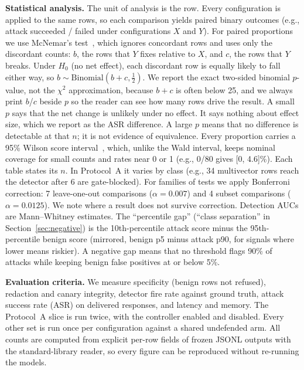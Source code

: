 \documentclass[conference]{IEEEtran}
\begin{document}
\textbf{Statistical analysis.} The unit of analysis is the row. Every configuration is applied to the same rows, so each comparison yields paired binary outcomes (e.g., attack succeeded / failed under configurations $X$ and $Y$). For paired proportions we use McNemar's test~\cite{mcnemar1947}, which ignores concordant rows and uses only the discordant counts: $b$, the rows that $Y$ fixes relative to $X$, and $c$, the rows that $Y$ breaks. Under $H_0$ (no net effect), each discordant row is equally likely to fall either way, so $b \sim \mathrm{Binomial}(b+c, \tfrac12)$. We report the exact two-sided binomial $p$-value, not the $\chi^2$ approximation, because $b+c$ is often below 25, and we always print $b$/$c$ beside $p$ so the reader can see how many rows drive the result. A small $p$ says that the net change is unlikely under no effect. It says nothing about effect size, which we report as the ASR difference. A large $p$ means that no difference is detectable at that $n$; it is not evidence of equivalence. Every proportion carries a 95\% Wilson score interval~\cite{wilson1927}, which, unlike the Wald interval, keeps nominal coverage for small counts and rates near 0 or 1 (e.g., 0/80 gives [0, 4.6]\%). Each table states its $n$. In Protocol~A it varies by class (e.g., 34 multivector rows reach the detector after 6 are gate-blocked). For families of tests we apply Bonferroni correction: 7 leave-one-out comparisons ($\alpha=0.007$) and 4 subset comparisons ($\alpha=0.0125$). We note where a result does not survive correction. Detection AUCs are Mann--Whitney estimates. The ``percentile gap'' (``class separation'' in Section~\ref{sec:negative}) is the 10th-percentile attack score minus the 95th-percentile benign score (mirrored, benign p5 minus attack p90, for signals where lower means riskier). A negative gap means that no threshold flags 90\% of attacks while keeping benign false positives at or below 5\%.

\textbf{Evaluation criteria.} We measure specificity (benign rows not refused), redaction and canary integrity, detector fire rate against ground truth, attack success rate (ASR) on delivered responses, and latency and memory. The Protocol~A slice is run twice, with the controller enabled and disabled. Every other set is run once per configuration against a shared undefended arm. All counts are computed from explicit per-row fields of frozen JSONL outputs with the standard-library reader, so every figure can be reproduced without re-running the models.
\end{document}
